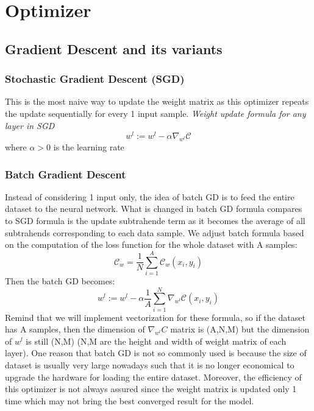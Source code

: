 \section{Optimizer}
\subsection{Gradient Descent and its variants}

\subsubsection{Stochastic Gradient Descent (SGD)}
This is the most naive way to update the weight matrix as this optimizer repeats the update sequentially for every 1 input sample.  
\textit{Weight update formula for any layer in SGD}
\begin{equation}
    w^{l} := w^{l} - \alpha \nabla_{w^{l}} \mathcal{C}
\end{equation}
where $\alpha > 0$ is the learning rate
\subsubsection{Batch Gradient Descent}
Instead of considering 1 input only, the idea of batch GD is to feed the entire dataset to the neural network. What is changed in batch GD formula compares to SGD formula is the update subtrahende term as it becomes the average of all subtrahends corresponding to each data sample. We adjust batch formula based on the computation of the loss function for the whole dataset with A samples:
\begin{equation}
    \mathcal{C}_{w} = \frac{1}{N} \sum^{A}_{i=1} \mathcal{C}_{w}(x_{i},y_{i})
\end{equation}
Then the batch GD becomes:
\begin{equation}
    w^{l} := w^{l} - \alpha \frac{1}{A} \sum^{N}_{i=1} \nabla_{w^{l}} \mathcal{C}(x_{i},y_{i})
\end{equation}
Remind that we will implement vectorization for these formula, so if the dataset has A samples, then the dimension of $\nabla_{w^{l}}C$ matrix is (A,N,M) but the dimension of $w^{l}$ is still (N,M) (N,M are the height and width of weight matrix of each layer).\newline\noindent
One reason that batch GD is not so commonly used is because the size of dataset is usually very large nowadays such that it is no longer economical to upgrade the hardware for loading the entire dataset. Moreover, the efficiency of this optimizer is not always assured since the weight matrix is updated only 1 time which may not bring the best converged result for the model.

